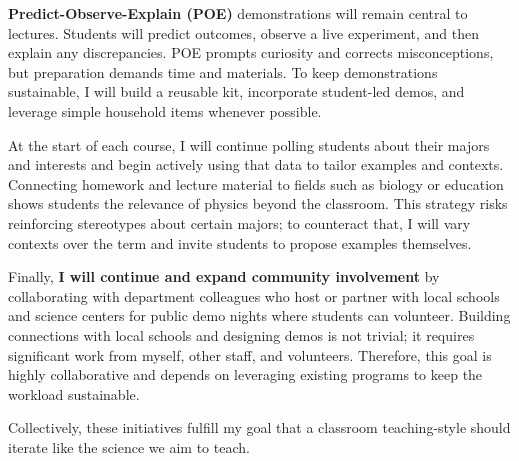 \documentclass[11pt]{article}
\begin{document}
\textbf{Predict-Observe-Explain (POE)} demonstrations will remain central to lectures. Students will predict outcomes, observe a live experiment, and then explain any discrepancies. POE prompts curiosity and corrects misconceptions, but preparation demands time and materials. To keep demonstrations sustainable, I will build a reusable kit, incorporate student-led demos, and leverage simple household items whenever possible.

At the start of each course, I will continue polling students about their majors and interests and begin actively using that data to tailor examples and contexts. Connecting homework and lecture material to fields such as biology or education shows students the relevance of physics beyond the classroom. This strategy risks reinforcing stereotypes about certain majors; to counteract that, I will vary contexts over the term and invite students to propose examples themselves.

Finally, \textbf{I will continue and expand community involvement} by collaborating with department colleagues who host or partner with local schools and science centers for public demo nights where students can volunteer. Building connections with local schools and designing demos is not trivial; it requires significant work from myself, other staff, and volunteers. Therefore, this goal is highly collaborative and depends on leveraging existing programs to keep the workload sustainable.

Collectively, these initiatives fulfill my goal that a classroom teaching-style should iterate like the science we aim to teach. 
\end{document}
